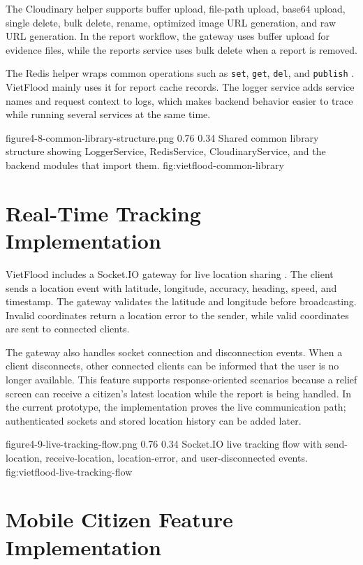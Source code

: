 The Cloudinary helper supports buffer upload, file-path upload, base64 upload, single delete, bulk delete, rename, optimized image URL generation, and raw URL generation. In the report workflow, the gateway uses buffer upload for evidence files, while the reports service uses bulk delete when a report is removed.

The Redis helper wraps common operations such as \texttt{set}, \texttt{get}, \texttt{del}, and \texttt{publish} \cite{redisDocs}. VietFlood mainly uses it for report cache records. The logger service adds service names and request context to logs, which makes backend behavior easier to trace while running several services at the same time.

\vfplaceholderfigure
    {figure4-8-common-library-structure.png}
    {0.76}
    {0.34}
    {Shared common library structure showing LoggerService, RedisService, CloudinaryService, and the backend modules that import them.}
    {fig:vietflood-common-library}

\section{Real-Time Tracking Implementation}

VietFlood includes a Socket.IO gateway for live location sharing \cite{socketioDocs}. The client sends a location event with latitude, longitude, accuracy, heading, speed, and timestamp. The gateway validates the latitude and longitude before broadcasting. Invalid coordinates return a location error to the sender, while valid coordinates are sent to connected clients.

The gateway also handles socket connection and disconnection events. When a client disconnects, other connected clients can be informed that the user is no longer available. This feature supports response-oriented scenarios because a relief screen can receive a citizen's latest location while the report is being handled. In the current prototype, the implementation proves the live communication path; authenticated sockets and stored location history can be added later.

\vfplaceholderfigure
    {figure4-9-live-tracking-flow.png}
    {0.76}
    {0.34}
    {Socket.IO live tracking flow with send-location, receive-location, location-error, and user-disconnected events.}
    {fig:vietflood-live-tracking-flow}

\section{Mobile Citizen Feature Implementation}

